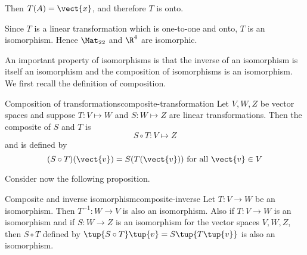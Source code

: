 \begin{solution}
Then $T(A)=\vect{x}$, and therefore $T$ is onto.

Since $T$ is a linear transformation which is one-to-one and onto, $T$ is an isomorphism. Hence $\Mat_{22}$ and $\R^4$ are isomorphic.
\end{solution}

An important property of isomorphisms is that the inverse of an isomorphism
is itself an isomorphism and the composition of isomorphisms is an
isomorphism. We first recall the definition of composition.

\begin{definition}{Composition of transformations}{composite-transformation}
Let $V, W, Z$ be vector spaces and suppose $T: V \mapsto W$ and $S: W \mapsto Z$ are linear transformations. Then the composite of $S$ and $T$ is
\[
S \circ T: V \mapsto Z
\]
and is defined by 
\[
(S \circ T) (\vect{v}) = S(T(\vect{v})) \mbox{ for all } \vect{v} \in V
\]
\end{definition}

Consider now the following proposition.

\begin{proposition}{Composite and inverse isomorphism}{composite-inverse}
Let $T:V\rightarrow W$ be an isomorphism. Then $T^{-1}:W\rightarrow V$ is
also an isomorphism. Also if $T:V\rightarrow W$ is an isomorphism and if $
S:W\rightarrow Z$ is an isomorphism for the vector spaces $V,W,Z$, then $
S\circ T$ defined by $\tup{S\circ T} \tup{v} = S\tup{
T\tup{v} } $ is also an isomorphism.
\end{proposition}

